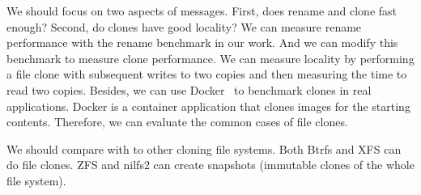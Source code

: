 We should focus on two aspects of \spt messages.
First, does \spt rename and clone fast enough?
Second, do \betrfs clones have good locality?
We can measure rename performance with the rename benchmark in our \rr work.
And we can modify this benchmark to measure clone performance.
We can measure locality by performing a file clone with subsequent writes to
two copies and then measuring the time to read two copies.
Besides, we can use Docker~\cite{docker} to benchmark clones in real
applications.
Docker is a container application that clones images for the starting contents.
Therefore, we can evaluate the common cases of file clones.

We should compare \betrfs with \spt to other cloning file systems.
Both Btrfs and XFS can do file clones.
ZFS and nilfs2 can create snapshots (immutable clones of the whole file system).
